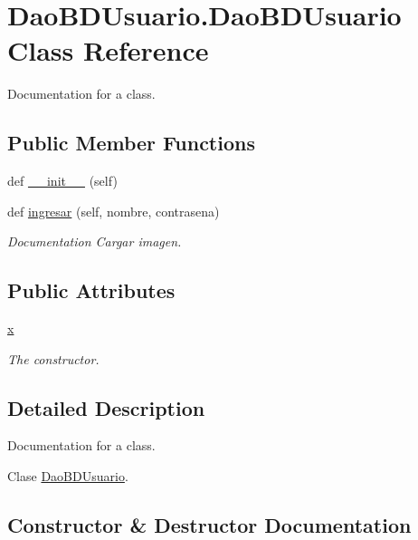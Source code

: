 \hypertarget{class_dao_b_d_usuario_1_1_dao_b_d_usuario}{}\section{Dao\+B\+D\+Usuario.\+Dao\+B\+D\+Usuario Class Reference}
\label{class_dao_b_d_usuario_1_1_dao_b_d_usuario}


Documentation for a class.  


\subsection*{Public Member Functions}
\begin{DoxyCompactItemize}
\item 
def \mbox{\hyperlink{class_dao_b_d_usuario_1_1_dao_b_d_usuario_a0dd4f3db57e87aed5fc0a672c38a71eb}{\+\_\+\+\_\+init\+\_\+\+\_\+}} (self)
\item 
def \mbox{\hyperlink{class_dao_b_d_usuario_1_1_dao_b_d_usuario_aa3396e05527bae188c9387b0163c89bb}{ingresar}} (self, nombre, contrasena)
\begin{DoxyCompactList}\small\item\em Documentation Cargar imagen. \end{DoxyCompactList}\end{DoxyCompactItemize}
\subsection*{Public Attributes}
\begin{DoxyCompactItemize}
\item 
\mbox{\hyperlink{class_dao_b_d_usuario_1_1_dao_b_d_usuario_a15d664a91973b8c3a9e817a0bd13d0fd}{x}}
\begin{DoxyCompactList}\small\item\em The constructor. \end{DoxyCompactList}\end{DoxyCompactItemize}


\subsection{Detailed Description}
Documentation for a class. 

Clase \mbox{\hyperlink{class_dao_b_d_usuario_1_1_dao_b_d_usuario}{Dao\+B\+D\+Usuario}}. 

\subsection{Constructor \& Destructor Documentation}
\mbox{\label{class_dao_b_d_usuario_1_1_dao_b_d_usuario_a0dd4f3db57e87aed5fc0a672c38a71eb}} 
